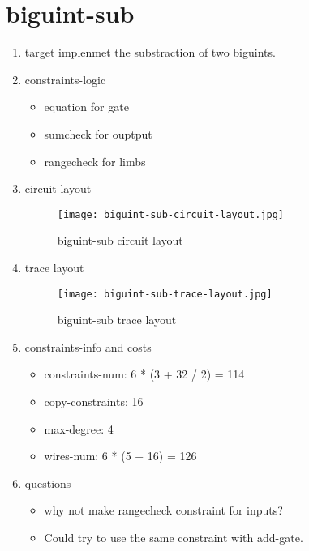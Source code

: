 \section{biguint-sub}
\label{biguint-sub}

\begin{enumerate}
    \item target
        implenmet the substraction of two biguints.
    \item constraints-logic
        \begin{itemize}
            \item equation for gate
            \item sumcheck for ouptput 
            \item rangecheck for limbs
        \end{itemize}
    \item circuit layout
        \begin{figure}[!ht]
            \centering
            \texttt{[image: biguint-sub-circuit-layout.jpg]}
            \caption{biguint-sub circuit layout}
            \label{fig:biguint-sub-circuit-layout}
        \end{figure}

    \item trace layout
        \begin{figure}[!ht]
            \centering
            \texttt{[image: biguint-sub-trace-layout.jpg]}
            \caption{biguint-sub trace layout}
            \label{fig:biguint-sub-trace-layout}
        \end{figure}
    
    \item constraints-info and costs
        \begin{itemize}
            \item constraints-num: 6 * (3 + 32 / 2) = 114
            \item copy-constraints: 16
            \item max-degree: 4
            \item wires-num: 6 * (5 + 16) = 126
        \end{itemize}

    \item questions
        \begin{itemize}
            \item why not make rangecheck constraint for inputs?
            \item Could try to use the same constraint with add-gate.
        \end{itemize}

\end{enumerate}